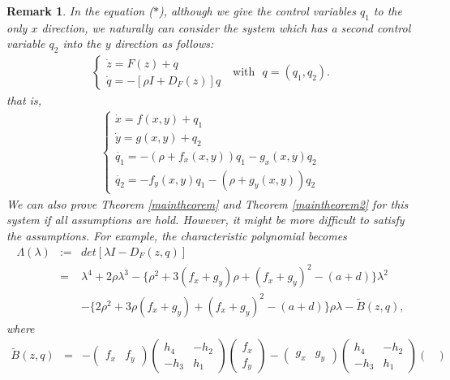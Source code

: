 \documentclass[11pt,reqno]{amsart}
\newtheorem{remark}[theorem]{Remark}
\begin{document}
\begin{remark}
In the equation ($\ast$), although we give the control variables $q_1$ to the only $x$ direction, we naturally can consider the system which has a second control variable $q_2$ into the $y$ direction as follows:
\begin{eqnarray}\label{2sideeq}
\begin{cases}
\dot{z}=F(z)+q\\
\dot{q}=-[\rho I+D_F(z)]q
\end{cases}\ \ \ \text{with}\ \ \  q=(q_1,q_2).
\end{eqnarray}
that is,
\begin{eqnarray}
\begin{cases}
\dot{x}=f(x,y)+q_1\\
\dot{y}=g(x,y)+q_2\\
\dot{q_1}=-(\rho+f_x(x,y))q_1-g_x(x,y)q_2\\
\dot{q_2}=-f_y(x,y)q_1-(\rho+g_y(x,y))q_2
\end{cases}\nonumber
\end{eqnarray}
We can also prove Theorem \ref{maintheorem} and Theorem \ref{maintheorem2} for this system if all assumptions are hold. However, it might be more difficult to satisfy the assumptions. For example, the characteristic polynomial becomes
\begin{eqnarray}\label{2sideeq2}
\Lambda(\lambda)&:=&det[\lambda I-D_F(z,q)]\nonumber\\
&=&\lambda^4+2\rho\lambda^3-\{\rho^2+3(f_x+g_y)\rho+(f_x+g_y)^2-(a+d)\}\lambda^2\nonumber\\
&& -\{2\rho^2+3\rho(f_x+g_y)+(f_x+g_y)^2-(a+d)\}\rho\lambda -\tilde{B}(z,q),
\end{eqnarray}
where
\begin{eqnarray}
\tilde{B}(z,q)&=&-\begin{pmatrix}
f_x & f_y
\end{pmatrix}
\begin{pmatrix}
h_4 & -h_2 \\
-h_3 & h_1
\end{pmatrix}\begin{pmatrix}
f_x\\ 
f_y
\end{pmatrix}
-\begin{pmatrix}
g_x & g_y
\end{pmatrix}
\begin{pmatrix}
h_4 & -h_2 \\
-h_3 & h_1
\end{pmatrix}\begin{pmatrix}

\end{pmatrix}
\end{eqnarray}
\end{remark}
\end{document}
